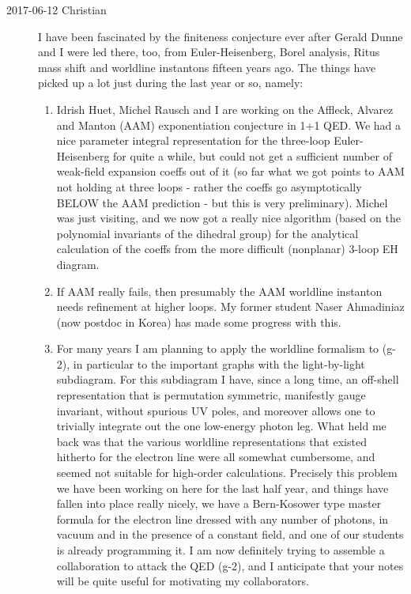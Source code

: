 \begin{description}

\item[2017-06-12 Christian]
I have been
fascinated by the finiteness conjecture ever after Gerald Dunne and I
were led there, too, from Euler-Heisenberg, Borel analysis,
Ritus mass shift and worldline instantons fifteen years ago.
The things have picked up a lot
just during the last year or so, namely:

\begin{enumerate}
  \item
Idrish Huet, Michel Rausch and I are working on the Affleck,
Alvarez and Manton (AAM) exponentiation conjecture in 1+1 QED.
We had a nice parameter integral representation for the three-loop
Euler-Heisenberg for quite a while, but could not get a sufficient number
of weak-field expansion coeffs out of it (so far what we got points to
AAM not holding at three loops - rather the coeffs go asymptotically
BELOW the AAM prediction - but this is very preliminary). Michel was just
visiting, and we now got a really nice algorithm (based on the polynomial
invariants of the dihedral group) for the analytical calculation of the
coeffs from the more difficult (nonplanar) 3-loop EH diagram.
  \item
If AAM really fails, then presumably the AAM worldline instanton needs
refinement at higher loops. My former student Naser Ahmadiniaz (now
postdoc in Korea) has made some progress with this.
  \item
For many years I am planning to apply the worldline formalism to (g-2),
in particular to the important graphs with the
light-by-light subdiagram. For this subdiagram I have, since a long time,
an off-shell representation that is permutation symmetric, manifestly
gauge invariant, without spurious UV poles, and moreover allows one to
trivially integrate out the one low-energy photon leg. What held me back
was that the various worldline representations that existed hitherto for
the electron line were all somewhat cumbersome, and seemed not suitable
for high-order calculations. Precisely this problem we have been working
on here for the last half year, and things have fallen into place really
nicely, we have a Bern-Kosower type master formula for the electron line
dressed with any number of photons, in vacuum and in the presence of a
constant field, and one of our students is already programming it. I am
now definitely trying to assemble a collaboration to attack the QED (g-2),
and I anticipate that your notes will be quite useful for motivating my
collaborators.


\end{enumerate}
\end{description}
